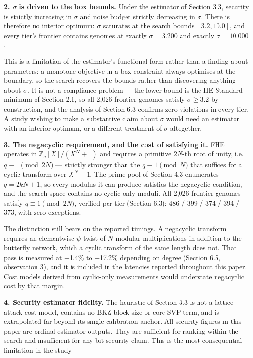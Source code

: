 \textbf{2. \(\sigma\) is driven to the box bounds.} Under the estimator of Section 3.3, security is strictly increasing in \(\sigma\) and noise budget strictly decreasing in \(\sigma\). There is therefore no interior optimum: \(\sigma\) saturates at the search bounds \([3.2, 10.0]\), and every tier's frontier contains genomes at exactly \(\sigma = 3.200\) and exactly \(\sigma = 10.000\).

This is a limitation of the estimator's functional form rather than a finding about parameters: a monotone objective in a box constraint always optimises at the boundary, so the search recovers the bounds rather than discovering anything about \(\sigma\). It is not a compliance problem --- the lower bound is the HE Standard minimum of Section 2.1, so all 2,026 frontier genomes satisfy \(\sigma \geq 3.2\) by construction, and the analysis of Section 6.3 confirms zero violations in every tier. A study wishing to make a substantive claim about \(\sigma\) would need an estimator with an interior optimum, or a different treatment of \(\sigma\) altogether.

\textbf{3. The negacyclic requirement, and the cost of satisfying it.} FHE operates in \(\mathbb{Z}_q[X]/(X^N + 1)\) and requires a primitive \(2N\)-th root of unity, i.e.~\(q \equiv 1 \pmod{2N}\) --- strictly stronger than the \(q \equiv 1 \pmod{N}\) that suffices for a cyclic transform over \(X^N - 1\). The prime pool of Section 4.3 enumerates \(q = 2kN + 1\), so every modulus it can produce satisfies the negacyclic condition, and the search space contains no cyclic-only moduli. All 2,026 frontier genomes satisfy \(q \equiv 1 \pmod{2N}\), verified per tier (Section 6.3): 486 / 399 / 374 / 394 / 373, with zero exceptions.

The distinction still bears on the reported timings. A negacyclic transform requires an elementwise \(\psi\) twist of \(N\) modular multiplications in addition to the butterfly network, which a cyclic transform of the same length does not. That pass is measured at +1.4\% to +17.2\% depending on degree (Section 6.5, observation 3), and it is included in the latencies reported throughout this paper. Cost models derived from cyclic-only measurements would understate negacyclic cost by that margin.

\textbf{4. Security estimator fidelity.} The heuristic of Section 3.3 is not a lattice attack cost model, contains no BKZ block size or core-SVP term, and is extrapolated far beyond its single calibration anchor. All security figures in this paper are ordinal estimator outputs. They are sufficient for ranking within the search and insufficient for any bit-security claim. This is the most consequential limitation in the study.

